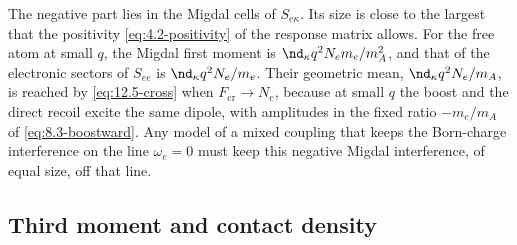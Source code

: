 The negative part lies in the Migdal cells of $S_{e\kappa}$. Its size is close to the largest that the positivity \cref{eq:4.2-positivity} of the response matrix allows. For the free atom at small $q$, the Migdal first moment is $\nd_\kappa q^2N_em_e/m_A^2$, and that of the electronic sectors of $S_{ee}$ is $\nd_\kappa q^2N_e/m_e$. Their geometric mean, $\nd_\kappa q^2N_e/m_A$, is reached by \cref{eq:12.5-cross} when $F_{\mathrm{cr}} \to N_e$, because at small $q$ the boost and the direct recoil excite the same dipole, with amplitudes in the fixed ratio $-m_e/m_A$ of \cref{eq:8.3-boostward}. Any model of a mixed coupling that keeps the Born-charge interference on the line $\omega_e = 0$ must keep this negative Migdal interference, of equal size, off that line.

\subsection{Third moment and contact density}\label{sec:12.5-third}

